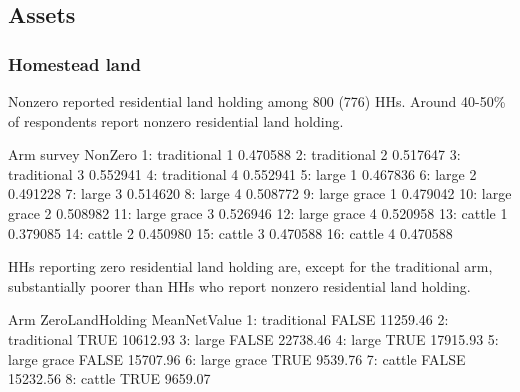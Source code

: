 \subsection{Assets}


\subsubsection{Homestead land}


Nonzero reported residential land holding among 800 (776) HHs. Around 40-50\% of respondents report nonzero residential land holding. 
\begin{Schunk}
\begin{Soutput}
            Arm survey  NonZero
 1: traditional      1 0.470588
 2: traditional      2 0.517647
 3: traditional      3 0.552941
 4: traditional      4 0.552941
 5:       large      1 0.467836
 6:       large      2 0.491228
 7:       large      3 0.514620
 8:       large      4 0.508772
 9: large grace      1 0.479042
10: large grace      2 0.508982
11: large grace      3 0.526946
12: large grace      4 0.520958
13:      cattle      1 0.379085
14:      cattle      2 0.450980
15:      cattle      3 0.470588
16:      cattle      4 0.470588
\end{Soutput}
\end{Schunk}
HHs reporting zero residential land holding are, except for the \textsf{traditional} arm, substantially poorer than HHs who report nonzero residential land holding.
\begin{Schunk}
\begin{Soutput}
           Arm ZeroLandHolding MeanNetValue
1: traditional           FALSE     11259.46
2: traditional            TRUE     10612.93
3:       large           FALSE     22738.46
4:       large            TRUE     17915.93
5: large grace           FALSE     15707.96
6: large grace            TRUE      9539.76
7:      cattle           FALSE     15232.56
8:      cattle            TRUE      9659.07
\end{Soutput}
\end{Schunk}

